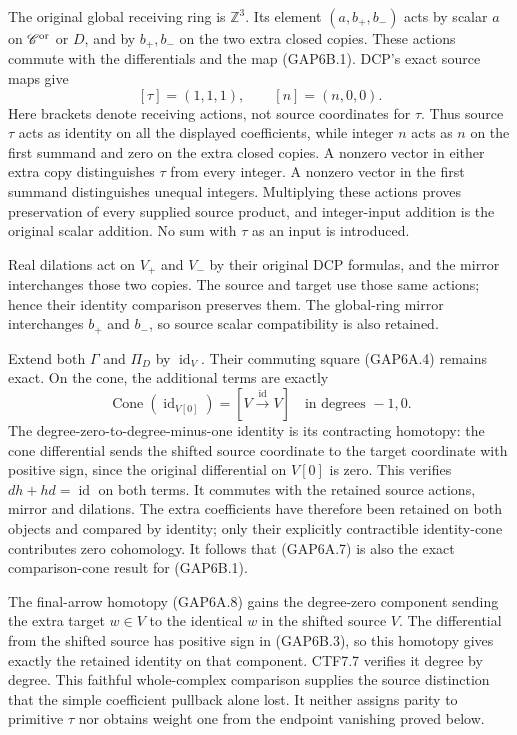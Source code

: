 The original global receiving ring is \(\mathbb Z^3\). Its element
\((a,b_+,b_-)\) acts by scalar \(a\) on \(\mathscr C^{\rm or}\) or
\(D\), and by \(b_+,b_-\) on the two extra closed copies. These actions
commute with the differentials and the map (GAP6B.1). DCP's exact source
maps give \[
[\tau]=(1,1,1),\qquad [n]=(n,0,0).
\tag{GAP6B.2}
\] Here brackets denote receiving actions, not source coordinates for
\(\tau\). Thus source \(\tau\) acts as identity on all the displayed
coefficients, while integer \(n\) acts as \(n\) on the first summand and
zero on the extra closed copies. A nonzero vector in either extra copy
distinguishes \(\tau\) from every integer. A nonzero vector in the first
summand distinguishes unequal integers. Multiplying these actions proves
preservation of every supplied source product, and integer-input
addition is the original scalar addition. No sum with \(\tau\) as an
input is introduced.

Real dilations act on \(V_+\) and \(V_-\) by their original DCP
formulas, and the mirror interchanges those two copies. The source and
target use those same actions; hence their identity comparison preserves
them. The global-ring mirror interchanges \(b_+\) and \(b_-\), so source
scalar compatibility is also retained.

Extend both \(\Gamma\) and \(\Pi_D\) by \(\operatorname{id}_V\). Their
commuting square (GAP6A.4) remains exact. On the cone, the additional
terms are exactly \[
\operatorname{Cone}(\operatorname{id}_{V[0]})
=[V\xrightarrow{\operatorname{id}}V]
\quad\text{in degrees }-1,0.
\tag{GAP6B.3}
\] The degree-zero-to-degree-minus-one identity is its contracting
homotopy: the cone differential sends the shifted source coordinate to
the target coordinate with positive sign, since the original
differential on \(V[0]\) is zero. This verifies
\(dh+hd=\operatorname{id}\) on both terms. It commutes with the retained
source actions, mirror and dilations. The extra coefficients have
therefore been retained on both objects and compared by identity; only
their explicitly contractible identity-cone contributes zero cohomology.
It follows that (GAP6A.7) is also the exact comparison-cone result for
(GAP6B.1).

The final-arrow homotopy (GAP6A.8) gains the degree-zero component
sending the extra target \(w\in V\) to the identical \(w\) in the
shifted source \(V\). The differential from the shifted source has
positive sign in (GAP6B.3), so this homotopy gives exactly the retained
identity on that component. CTF7.7 verifies it degree by degree. This
faithful whole-complex comparison supplies the source distinction that
the simple coefficient pullback alone lost. It neither assigns parity to
primitive \(\tau\) nor obtains weight one from the endpoint vanishing
proved below.

